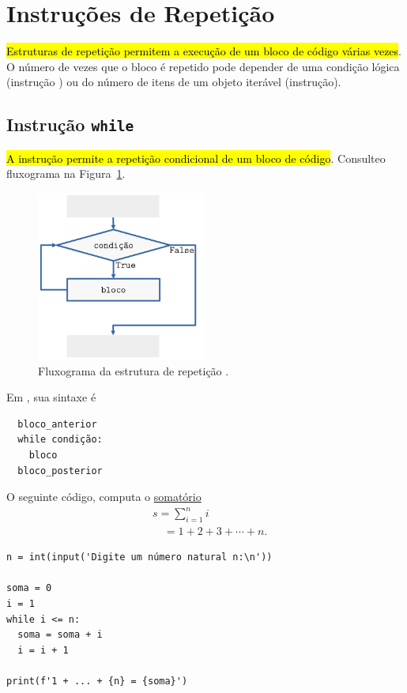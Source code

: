 \section{Instruções de Repetição}\label{cap_progest_sec_repete}

\hl{Estruturas de repetição permitem a execução de um bloco de código várias vezes}. O número de vezes que o bloco é repetido pode depender de uma condição lógica (instrução {\PYTHONwhile}) ou do número de itens de um objeto iterável (instrução{\PYTHONfor}).

\subsection{Instrução \texttt{while}}

\hl{A instrução {\PYTHONwhile} permite a repetição condicional de um bloco de código}. Consulteo fluxograma na Figura~\ref{fig:cap_progest_sec_repete:fig:fg_while}.

\begin{figure}[H]
  \centering
  \includegraphics[width=2.2in]{./cap_progest/dados/fig_fg_while/fig.png}
  \caption{Fluxograma da estrutura de repetição {\PYTHONwhile}.}
  \label{fig:cap_progest_sec_repete:fig:fg_while}
\end{figure}

Em {\python}, sua sintaxe é

\begin{lstlisting}
  bloco_anterior
  while condição:
    bloco
  bloco_posterior
\end{lstlisting}
  

\begin{ex}\label{cap_progest_ec_repete:ex:while_soma_num}
  O seguinte código, computa o \href{https://pt.wikipedia.org/wiki/Somat%C3%B3rio}{somatório}
  \begin{align}
    & s = \sum_{i=1}^{n}i \\
    & \text{}\quad = 1 + 2 + 3 + \cdots + n.
  \end{align}

\begin{lstlisting}
n = int(input('Digite um número natural n:\n'))

soma = 0
i = 1
while i <= n:
  soma = soma + i
  i = i + 1

print(f'1 + ... + {n} = {soma}')
\end{lstlisting}

\end{ex}

